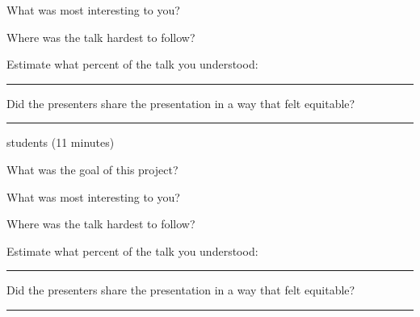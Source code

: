 \documentclass[12pt,letterpaper,noanswers]{exam}
\begin{document}
 \noindent What was most interesting to you?
\vfill
 
 \noindent Where was the talk hardest to follow?
\vfill
 
 \noindent Estimate what percent of the talk you understood:  \rule{0.5in}{0.5pt}
 
 \noindent Did the presenters share the presentation in a way that felt equitable?
\vfill
 
 \hrule
  \vspace{0.1cm}
 

  students (11 minutes)
 
  \noindent What was the goal of this project?
\vfill
 
 \noindent What was most interesting to you?
\vfill
 
 \noindent Where was the talk hardest to follow?
\vfill
 
 \noindent Estimate what percent of the talk you understood:  \rule{0.5in}{0.5pt}
 
 \noindent Did the presenters share the presentation in a way that felt equitable?
\vfill
 \hrule
  \vspace{0.1cm}

 
\eject
\end{document}
